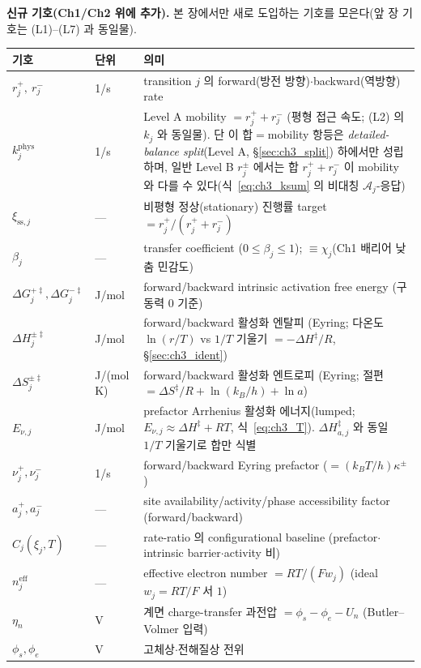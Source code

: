 \documentclass[11pt,a4paper]{article}
\newcommand{\eff}{\mathrm{eff}}
\newcommand{\sstat}{\mathrm{ss}}
\begin{document}
\textbf{신규 기호(Ch1/Ch2 위에 추가).} 본 장에서만 새로 도입하는 기호를 모은다(앞 장 기호는 (L1)--(L7) 과 동일물).
\begin{longtable}{p{} p{} >{\raggedright\arraybackslash}p{}}
\toprule 기호 & 단위 & 의미 \\ \midrule \endhead
$r_j^+,\ r_j^-$ & 1/s & transition $j$ 의 forward(방전 방향)$\cdot$backward(역방향) rate \\
$k_j^{\mathrm{phys}}$ & 1/s & Level A mobility $=r_j^++r_j^-$ (평형 접근 속도; (L2) 의 $k_j$ 와 동일물). 단 이 합$=$mobility 항등은 \emph{detailed-balance split}(Level A, \S\ref{sec:ch3_split}) 하에서만 성립하며, 일반 Level B $r_j^\pm$ 에서는 합 $r_j^++r_j^-$ 이 mobility 와 다를 수 있다(식~\eqref{eq:ch3_ksum} 의 비대칭 $\mathcal A_j$-응답) \\
$\xi_{\sstat,j}$ & --- & 비평형 정상(stationary) 진행률 target $=r_j^+/(r_j^++r_j^-)$ \\
$\beta_j$ & --- & transfer coefficient ($0\le\beta_j\le1$); \textbf{$\equiv\chi_j$}(Ch1 배리어 낮춤 민감도) \\
$\Delta G_j^{+\ddagger},\Delta G_j^{-\ddagger}$ & J/mol & forward/backward intrinsic activation free energy (구동력 $0$ 기준) \\
$\Delta H_j^{\pm\ddagger}$ & J/mol & forward/backward 활성화 엔탈피 (Eyring; 다온도 $\ln(r/T)$ vs $1/T$ 기울기 $=-\Delta H^\ddagger/R$, \S\ref{sec:ch3_ident}) \\
$\Delta S_j^{\pm\ddagger}$ & J/(mol\,K) & forward/backward 활성화 엔트로피 (Eyring; 절편 $=\Delta S^\ddagger/R+\ln(k_B/h)+\ln a$) \\
$E_{\nu,j}$ & J/mol & prefactor Arrhenius 활성화 에너지(lumped; $E_{\nu,j}\approx\Delta H^\ddagger+RT$, 식~\eqref{eq:ch3_T}). $\Delta H_{a,j}^\ddagger$ 와 동일 $1/T$ 기울기로 합만 식별 \\
$\nu_j^+,\nu_j^-$ & 1/s & forward/backward Eyring prefactor ($=(k_BT/h)\kappa^\pm$) \\
$a_j^+,a_j^-$ & --- & site availability/activity/phase accessibility factor (forward/backward) \\
$C_j(\xi_j,T)$ & --- & rate-ratio 의 configurational baseline (prefactor$\cdot$intrinsic barrier$\cdot$activity 비) \\
$n_j^{\eff}$ & --- & effective electron number $=RT/(Fw_j)$ (ideal $w_j=RT/F$ 서 $1$) \\
$\eta_n$ & V & 계면 charge-transfer 과전압 $=\phi_s-\phi_e-U_n$ (Butler--Volmer 입력) \\
$\phi_s,\phi_e$ & V & 고체상$\cdot$전해질상 전위 \\

\end{longtable}
\end{document}

